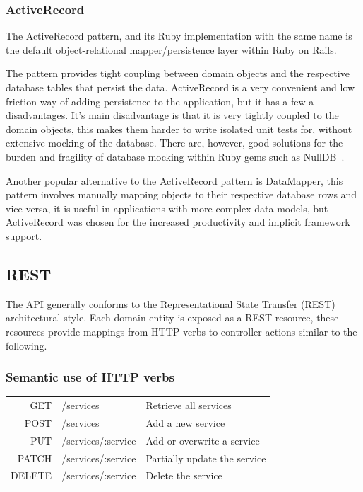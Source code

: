 \documentclass{cshonours}
\begin{document}
\subsubsection{ActiveRecord}

The ActiveRecord\cite{ActiveRecord} pattern, and its Ruby implementation with the same name is the default object-relational mapper/persistence layer within Ruby on Rails.

The pattern provides tight coupling between domain objects and the respective database tables that persist the data. ActiveRecord is a very convenient and low friction way of adding persistence to the application, but it has a few a disadvantages. It's main disadvantage is that it is very tightly coupled to the domain objects, this makes them harder to write isolated unit tests for, without extensive mocking of the database. There are, however, good solutions for the burden and fragility of database mocking within Ruby gems such as NullDB~\cite{NullDB}.

Another popular alternative to the ActiveRecord pattern is DataMapper\cite{DataMapper}, this pattern involves manually mapping objects to their respective database rows and vice-versa, it is useful in applications with more complex data models, but ActiveRecord was chosen for the increased productivity and implicit framework support.

\subsection{REST}
\label{rest}

The API generally conforms to the Representational State Transfer (REST) architectural style. Each domain entity is exposed as a REST resource, these resources provide mappings from HTTP verbs to controller actions similar to the following.

\subsubsection{Semantic use of HTTP verbs}

\begin{table}[h]
  \centering
\begin{tabular}{r|l|l|}
  GET & /services & Retrieve all services \\
  POST & /services & Add a new service \\
  PUT & /services/:service & Add or overwrite a service \\
  PATCH & /services/:service & Partially update the service \\
  DELETE & /services/:service & Delete the service \\
\end{tabular}
\end{table}
\end{document}

